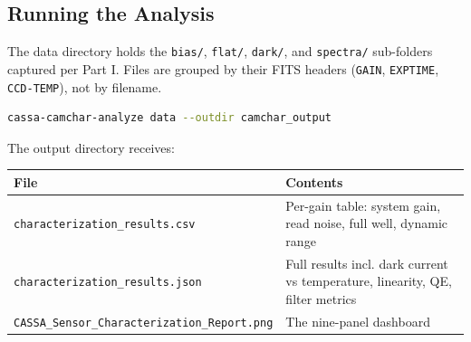 \documentclass[11pt,a4paper]{article}
\begin{document}
\subsection{Running the Analysis}
The data directory holds the \texttt{bias/}, \texttt{flat/}, \texttt{dark/}, and \texttt{spectra/} sub-folders captured per Part I. Files are grouped by their FITS headers (\texttt{GAIN}, \texttt{EXPTIME}, \texttt{CCD-TEMP}), not by filename.
\begin{lstlisting}[language=bash]
cassa-camchar-analyze data --outdir camchar_output
\end{lstlisting}
The output directory receives:
\begin{center}
\begin{tabularx}{\textwidth}{|l|X|}
\hline
\textbf{File} & \textbf{Contents} \\
\hline
\texttt{characterization\_results.csv} & Per-gain table: system gain, read noise, full well, dynamic range \\
\hline
\texttt{characterization\_results.json} & Full results incl. dark current vs temperature, linearity, QE, filter metrics \\
\hline
\texttt{CASSA\_Sensor\_Characterization\_Report.png} & The nine-panel dashboard \\
\hline
\end{tabularx}
\end{center}
\end{document}
